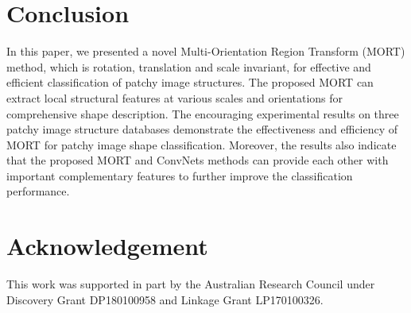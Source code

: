 \documentclass[letterpaper]{article} %
\begin{document}
\section{Conclusion}

In this paper, we presented a novel Multi-Orientation Region Transform (MORT) method, which is rotation, translation and scale invariant, for effective and efficient classification of patchy image structures. The proposed MORT can extract local structural features at various scales and orientations for comprehensive shape description. The encouraging experimental results on three patchy image structure databases demonstrate the effectiveness and efficiency of MORT for patchy image shape classification. Moreover, the results also indicate that the proposed MORT and ConvNets methods can provide each other with important complementary features to further improve the classification performance. 

\section{Acknowledgement}
This work was supported in part by the Australian Research Council under Discovery Grant DP180100958 and Linkage Grant LP170100326. 



\end{document}
